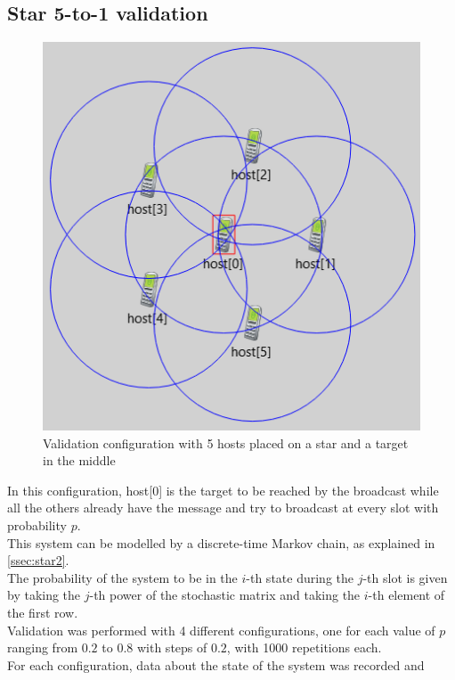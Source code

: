 \subsection{Star 5-to-1 validation}
\begin{figure}
	\includegraphics[width=1\linewidth]{img/omnetStar5to1.png} 
	\caption{Validation configuration with 5 hosts placed on a star and a target in the middle}
	\label{fig:star5to1GUI}
\end{figure}
In this configuration, host[0] is the target to be reached by the broadcast
while all the others already have the message and try to broadcast at every
slot with probability $p$.\\
This system can be modelled by a discrete-time Markov chain, as explained in
\ref{ssec:star2}.\\
The probability of the system to be in the $i$-th state during the $j$-th slot
is given by taking the $j$-th power of the stochastic matrix and taking the
$i$-th element of the first row.\\
Validation was performed with 4 different configurations, one for each value of
$p$ ranging from $0.2$ to $0.8$ with steps of $0.2$, with 1000 repetitions
each.\\
For each configuration, data about the state of the system was recorded and
